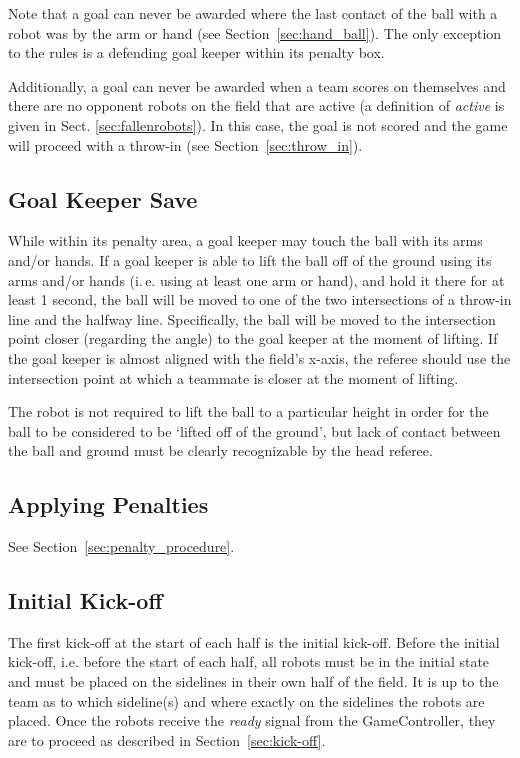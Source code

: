 \documentclass[12pt]{article}
\newcommand{\ie}{\mbox{i.\,e.}\xspace}
\begin{document}
Note that a goal can never be awarded where the last contact of the ball with a robot was by the arm or hand (see Section~\ref{sec:hand_ball}).  The only exception to the rules is a defending goal keeper within its penalty box.

Additionally, a goal can never be awarded when a team scores on themselves and there are no opponent robots on the field that are active (a definition of \emph{active} is given in Sect. \ref{sec:fallenrobots}).  In this case, the goal is not scored and the game will proceed with a throw-in (see Section~\ref{sec:throw_in}).

\subsection{Goal Keeper Save}
\label{sec:goalie_save}
While within its penalty area, a goal keeper may touch the ball with its arms and/or hands.  If a goal keeper is able to lift the ball off of the ground using its arms and/or hands (\ie using at least one arm or hand), and hold it there for at least 1 second, the ball will be moved to one of the two intersections of a throw-in line and the halfway line. Specifically, the ball will be moved to the intersection point closer (regarding the angle) to the goal keeper at the moment of lifting. If the goal keeper is almost aligned with the field's x-axis, the referee should use the intersection point at which a teammate is closer at the moment of lifting.

The robot is not required to lift the ball to a particular height in order for the ball to be considered to be `lifted off of the ground', but lack of contact between the ball and ground must be clearly recognizable by the head referee.

\subsection{Applying Penalties}

See Section~\ref{sec:penalty_procedure}.


\subsection{Initial Kick-off}
\label{sec:initial-kick-off}

The first kick-off at the start of each half is the initial kick-off.
Before the initial kick-off, i.e. before the start of each half, all robots must be in the initial state and must be placed on the sidelines in their own half of the field.
It is up to the team as to which sideline(s) and where exactly on the sidelines the robots are placed.
Once the robots receive the \emph{ready} signal from the GameController, they are to proceed as described in Section~\ref{sec:kick-off}.
\end{document}
